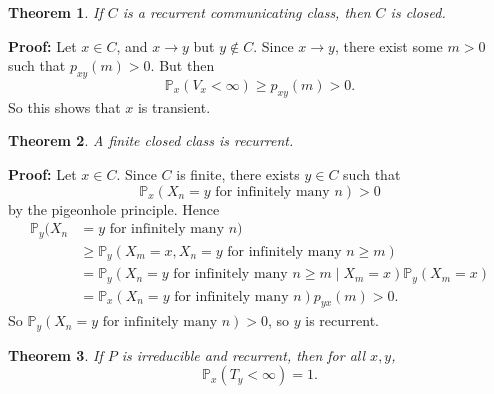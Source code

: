 \documentclass[12pt]{article}
\newtheorem{theorem}{Theorem}[section]
\theoremstyle{definition}
\theoremstyle{remark}
\begin{document}
\begin{theorem}
	If $C$ is a recurrent communicating class, then $C$ is closed.
\end{theorem}

\begin{adjustbox}{minipage = \columnwidth - 25.5pt, margin=1em, frame=1pt, margin=0em}
	\textbf{Proof:} Let $x \in C$, and $x \to y$ but $y \not \in C$. Since $x \to y$, there exist some $m > 0$ such that $p_{xy}(m) > 0$. But then
	\[
		\mathbb{P}_x(V_x < \infty) \geq p_{xy}(m) > 0
	.\]
	So this shows that $x$ is transient.
\end{adjustbox}

\begin{theorem}
	A finite closed class is recurrent.
\end{theorem}

\begin{adjustbox}{minipage = \columnwidth - 25.5pt, margin=1em, frame=1pt, margin=0em}
	\textbf{Proof:} Let $x \in C$. Since $C$ is finite, there exists $y \in C$ such that
	\[
		\mathbb{P}_x(X_n = y \text{ for infinitely many } n) > 0
	\]
	by the pigeonhole principle. Hence
	\begin{align*}
		\mathbb{P}_y(X_n &= y \text{ for infinitely many } n) \\
				 &\geq \mathbb{P}_y(X_m = x, X_n = y \text{ for infinitely many } n \geq m) \\
								     &= \mathbb{P}_y (X_n = y \text{ for infinitely many } n \geq m \mid X_m = x)\mathbb{P}_y(X_m = x) \\
								     &= \mathbb{P}_x(X_n = y \text{ for infinitely many } n) p_{yx}(m) > 0.
	\end{align*}
	So $\mathbb{P}_y(X_n = y \text{ for infinitely many } n) > 0$, so $y$ is recurrent.
\end{adjustbox}

\begin{theorem}
	If $P$ is irreducible and recurrent, then for all $x, y$,
	\[
		\mathbb{P}_x(T_y < \infty) = 1
	.\]
\end{theorem}
\end{document}
